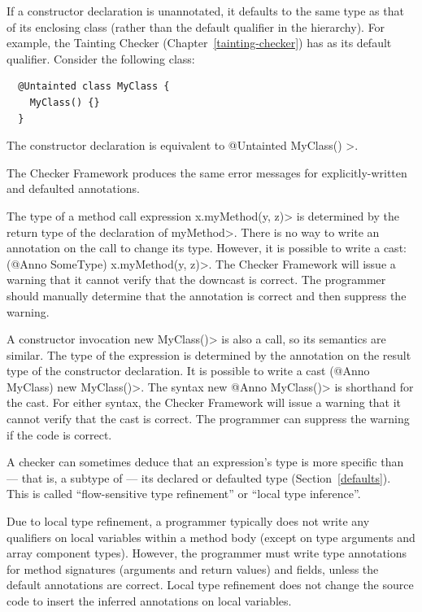 
If a constructor declaration is unannotated, it defaults to the same type as that of
its enclosing class (rather than the default qualifier in the hierarchy).
For example, the Tainting Checker (Chapter~\ref{tainting-checker}) has 
as its default qualifier. Consider the following class:

\begin{Verbatim}
  @Untainted class MyClass {
    MyClass() {}
  }
\end{Verbatim}

\noindent
The constructor declaration is equivalent to \<@Untainted MyClass() \ttlcb\ttrcb>.

The Checker Framework produces the same error messages for
explicitly-written and defaulted annotations.



The type of a method call expression \<x.myMethod(y, z)> is determined by
the return type of the declaration of \<myMethod>.  There is no way to
write an annotation on the call to change its type.  However, it is
possible to write a cast:  \<(@Anno SomeType) x.myMethod(y, z)>.  The Checker
Framework will issue a warning that it cannot verify that the downcast is
correct.  The programmer should manually determine that the annotation is
correct and then suppress the warning.

A constructor invocation \<new MyClass()> is also a call, so its semantics
are similar.  The type of the expression is determined by the annotation on
the result type of the constructor declaration.  It is possible to write a cast
\<(@Anno MyClass) new MyClass()>.  The syntax \<new @Anno MyClass()> is shorthand
for the cast.  For either syntax, the Checker Framework will issue a
warning that it cannot verify that the cast is correct.  The programmer can
suppress the warning if the code is correct.



A checker can sometimes deduce that an expression's type is more specific
than --- that is, a subtype of --- its declared or defaulted type (Section~\ref{defaults}).
This is called ``flow-sensitive type refinement'' or ``local type inference''.

Due to local type refinement, a programmer typically
does not write any qualifiers on local variables within a method body
(except on type arguments and array component types).
However, the programmer must write type annotations for method
signatures (arguments and return values) and fields, unless the default
annotations are correct.
Local type refinement does not change the source code to insert the
inferred annotations on local variables.


